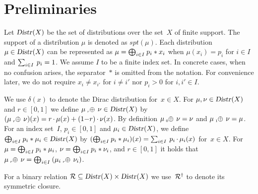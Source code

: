 

\section{Preliminaries}

\label{sec-prelim}

Let $\textsl{Distr}\mkern1mu(X)$ be the set of distributions over the set~$X$ of finite
support. The support of a distribution $\mu$ is denoted as $\mathit{spt}(\mu)$.
Each distribution $\mu \in \textsl{Distr}\mkern1mu(X)$ can be represented as $\mu
= \textstyle{\bigoplus_{i \mathord{\in} I}} \: p_i * x_i$ when $\mu(x_i) = p_i$ for $i \in I$ and
$\textstyle\sum_{i {\in} I} \: p_i = 1$. 
%
We assume $I$ to be a finite index set.
%
In concrete cases, when no confusion arises, the separator~$\ast$ is
omitted from the notation.
%
For convenience later, we do not require $x_i
\neq x_{i'}$ for $i \neq i'$ nor $p_i > 0$ for $i, i' \in I$.

We use $\delta(x)$ to denote the Dirac distribution for~$x \in X$.
%
For $\mu, \nu \in \textsl{Distr}\mkern1mu(X)$ and $r \in [0,1]$ we define $\mu \oplusr
\nu \in \DistrX$ by $(\mu \oplusr \nu)(x) = r \mycdot \mu(x) + (1{-}r)
\mycdot \nu(x)$. By definition $\mu \probc0 \nu = \nu$ and $\mu
\probc1 \nu = \mu$. 
%
For an index set~$I$, $p_i \in [0,1]$ and $\mu_i \in \textsl{Distr}\mkern1mu(X)$, we
define $\textstyle{\bigoplus_{i \mathord{\in} I}} \: p_i * \mu_i \in \textsl{Distr}\mkern1mu(X)$ by $(\textstyle{\bigoplus_{i \mathord{\in} I}}
\: p_i * \mu_i)(x) = \textstyle\sum_{i {\in} I} \: p_i \mathop{\cdot} \mu_i(x)$ for~$x \in
X$. For $\mu = \textstyle{\bigoplus_{i \mathord{\in} I}} \: p_i * \mu_i$, $\nu = \textstyle{\bigoplus_{i \mathord{\in} I}} \:
p_i * \nu_i$, and $r \in [0,1]$ it holds that $\mu \oplusr \nu =
\bigoplusiinI \: ( \mu_i \oplusr \nu_i )$.

For a binary relation $\mathcal{R} \subseteq \textsl{Distr}\mkern1mu(X) \times \textsl{Distr}\mkern1mu(X)$ we
use~$\mathcal{R}^\dagger$ to denote its symmetric closure.



